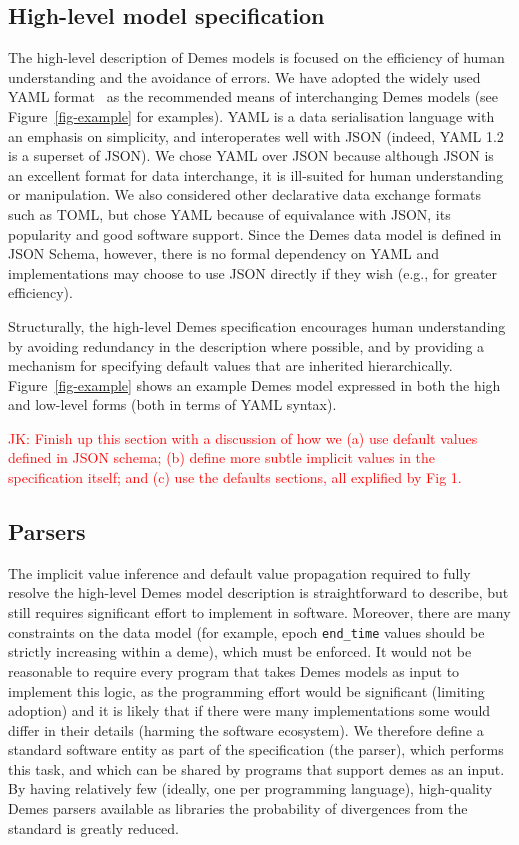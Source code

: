 \documentclass[11pt]{article}
\newcommand{\jkcomment}[1]{{\textcolor{red}{JK: #1}}}
\begin{document}
\subsection*{High-level model specification}

The high-level description of Demes models is focused on the efficiency of
human understanding and the avoidance of errors. We have adopted the widely
used YAML format~\citep{ben2009yaml} as the recommended means of interchanging
Demes models (see Figure~\ref{fig-example} for examples). YAML is a data
serialisation language with an emphasis on simplicity, and interoperates well
with JSON (indeed, YAML 1.2 is a superset of JSON). We chose YAML over JSON
because although JSON is an excellent format for data interchange, it is
ill-suited for human understanding or manipulation. We also considered other
declarative data exchange formats such as TOML,
but chose YAML because of equivalance with JSON,
its popularity and good software support.
Since the Demes data model is defined in JSON Schema,
however, there is no formal dependency on YAML and implementations may choose
to use JSON directly if they wish (e.g., for greater efficiency).

Structurally, the high-level Demes specification encourages human understanding
by avoiding redundancy in the description where possible, and
by providing a mechanism for specifying default values that
are inherited hierarchically. Figure~\ref{fig-example} shows an example
Demes model expressed in both the high and low-level forms (both in
terms of YAML syntax).

\jkcomment{Finish up this section with a discussion of how we (a)
use default values defined in JSON schema; (b) define more
subtle implicit values in the specification itself; and (c) use the
defaults sections, all explified by Fig 1.}

\subsection*{Parsers}
The implicit value inference and default value propagation required to
fully resolve the high-level Demes model description is straightforward
to describe, but still requires significant effort to implement in
software. Moreover, there are many constraints on the data model
(for example, epoch \texttt{end\_time} values should be strictly increasing
within a deme), which must be enforced.
It would not be reasonable to require every program that
takes Demes models as input to implement this logic, as the programming
effort would be significant (limiting adoption)
and it is likely that if there were many implementations some would differ
in their details (harming the software ecosystem). We therefore define
a standard software entity as part of the specification (the parser),
which performs this task, and which can be shared by programs that
support demes as an input. By having relatively few (ideally, one
per programming language), high-quality Demes parsers available as
libraries the probability of divergences from the standard is
greatly reduced.
\end{document}
